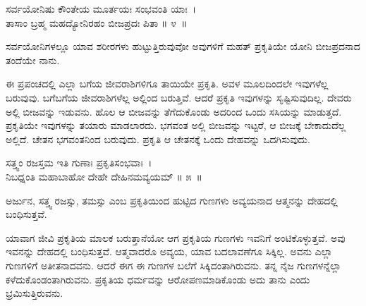 \begin{shloka}
ಸರ್ವಯೋನಿಷು ಕೌಂತೇಯ ಮೂರ್ತಯಃ ಸಂಭವಂತಿ ಯಾಃ~।\\ತಾಸಾಂ ಬ್ರಹ್ಮ ಮಹದ್ಯೋನಿರಹಂ ಬೀಜಪ್ರದಃ ಪಿತಾ \hfill॥ ೪~॥
\end{shloka}

\begin{artha}
ಸರ್ವಯೋನಿಗಳಲ್ಲೂ ಯಾವ ಶರೀರಗಳು ಹುಟ್ಟುತ್ತಿರುವುವೋ ಅವುಗಳಿಗೆ ಮಹತ್ ಪ್ರಕೃತಿಯೇ ಯೋನಿ ಬೀಜಪ್ರದನಾದ ತಂದೆಯೇ ನಾನು.
\end{artha}

ಈ ಪ್ರಪಂಚದಲ್ಲಿ ಎಲ್ಲಾ ಬಗೆಯ ಜೀವರಾಶಿಗಳಿಗೂ ತಾಯಿಯೇ ಪ್ರಕೃತಿ. ಅವಳ ಮೂಲದಿಂದಲೇ ಇವುಗಳೆಲ್ಲ ಬರುವುವು. ಬಗೆಬಗೆಯ ಜೀವರಾಶಿಗಳೆಲ್ಲ ಅಲ್ಲಿಂದ ಬರುತ್ತಿವೆ. ಆದರೆ ಪ್ರಕೃತಿ ಇವುಗಳನ್ನು ಸೃಷ್ಟಿಸುವುದಿಲ್ಲ. ದೇವರು ಅಲ್ಲಿ ಬೀಜವನ್ನು ಇಡುವನು. ಹೊಲ ಆ ಬೀಜವನ್ನು ತೆಗೆದುಕೊಂಡು ಅದರಿಂದ ಒಂದು ಸಸಿಯನ್ನು ಮಾಡುತ್ತದೆ. ಪ್ರಕೃತಿಯೇ ಇವುಗಳನ್ನು ತಯಾರು ಮಾಡಲಾರದು. ಭಗವಂತ ಅಲ್ಲಿ ಬೀಜವನ್ನು ಇಟ್ಟರೆ, ಆ ಬೀಜಕ್ಕೆ ಬೇಕಾದುದೆಲ್ಲ ಅಲ್ಲಿದೆ. ಚೇತನ ಭಗವಂತನಿಂದ ಬರುವುದು. ಪ್ರಕೃತಿ ಆ ಚೇತನಕ್ಕೆ ಒಂದು ದೇಹವನ್ನು ಒದಗಿಸುವುದು.

\begin{shloka}
ಸತ್ತ್ವಂ ರಜಸ್ತಮ ಇತಿ ಗುಣಾಃ ಪ್ರಕೃತಿಸಂಭವಾಃ~।\\ನಿಬಧ್ನಂತಿ ಮಹಾಬಾಹೋ ದೇಹೇ ದೇಹಿನಮವ್ಯಯಮ್ \hfill॥ ೫~॥
\end{shloka}

\begin{artha}
ಅರ್ಜುನ, ಸತ್ತ್ವ ರಜಸ್ಸು, ತಮಸ್ಸು ಎಂಬ ಪ್ರಕೃತಿಯಿಂದ ಹುಟ್ಟಿದ ಗುಣಗಳು ಅವ್ಯಯನಾದ ಆತ್ಮನನ್ನು ದೇಹದಲ್ಲಿ ಬಂಧಿಸುತ್ತವೆ.
\end{artha}

ಯಾವಾಗ ಜೀವಿ ಪ್ರಕೃತಿಯ ಮಾಲಕ ಬರುತ್ತಾನೆಯೋ ಆಗ ಪ್ರಕೃತಿಯ ಗುಣಗಳು ಇವನಿಗೆ ಅಂಟಿಕೊಳ್ಳುತ್ತವೆ. ಅವು ಇವನನ್ನು ದೇಹದಲ್ಲಿ ಬಂಧಿಸುತ್ತವೆ. ಆತ್ಮವಾದರೊ ಅವ್ಯಯ, ಯಾವ ಬದಲಾವಣೆಗೂ ಸಿಕ್ಕಿಲ್ಲ. ಅವನು ಎಲ್ಲಾ ಗುಣಗಳಿಗೆ ಅತೀತನಾದವನು. ಆದರೆ ಈಗ ಈ ಗುಣಗಳ ಬಲೆಗೆ ಸಿಕ್ಕಿದಂತಾಗಿರುವನು. ತನ್ನ ನೈಜ ಗುಣಗಳನ್ನೆಲ್ಲಾ ಕಳೆದುಕೊಂಡಂತಾಗಿರುವನು. ಪ್ರಕೃತಿಯ ಧರ್ಮವನ್ನು ಆರೋಪಣಮಾಡಿಕೊಂಡು ಅದು ತಾನು ಎಂದು ಭ್ರಮಿಸುತ್ತಿರುವನು.

